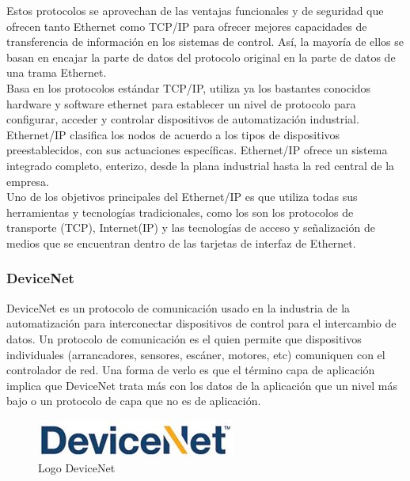 \documentclass[12pt,titlepage]{article}
\begin{document}
Estos protocolos se aprovechan de las ventajas funcionales y de seguridad que ofrecen tanto Ethernet como TCP/IP  para ofrecer mejores capacidades de transferencia de información en los sistemas de control. Así, la mayoría de ellos se basan en encajar la parte de datos del protocolo original en la parte de datos de una trama Ethernet. \\ 

Basa en los protocolos estándar TCP/IP, utiliza ya los bastantes conocidos hardware y software ethernet para establecer un nivel de protocolo para configurar, acceder y controlar dispositivos de automatización industrial. Ethernet/IP clasifica los nodos de acuerdo a los tipos de dispositivos preestablecidos, con sus actuaciones específicas. Ethernet/IP ofrece un sistema integrado completo, enterizo, desde la plana industrial hasta la red central de la empresa. \\

Uno de los objetivos principales del Ethernet/IP es que utiliza todas sus herramientas y tecnologías tradicionales, como los son los protocolos de transporte (TCP), Internet(IP) y las tecnologías de acceso y señalización de medios que se encuentran dentro de las tarjetas de interfaz de Ethernet. \\ 

\newpage
\subsubsection{DeviceNet}
DeviceNet es un protocolo de comunicación  usado en la industria de la automatización para interconectar dispositivos de control para el intercambio de datos. Un protocolo de comunicación es el quien  permite que dispositivos individuales (arrancadores, sensores, escáner, motores, etc) comuniquen con el controlador de red. Una forma de verlo es que el término capa de aplicación implica que DeviceNet trata más con los datos de la aplicación que un nivel más bajo o un protocolo de capa que no es de aplicación. \\[0.8mm]

\begin{figure}[htbp]
\hspace*{5.6cm} 
\includegraphics[scale=0.89]{DeviceNet_Logo}
\caption{Logo DeviceNet}
\end{figure}
\vspace{8mm}
\end{document}
